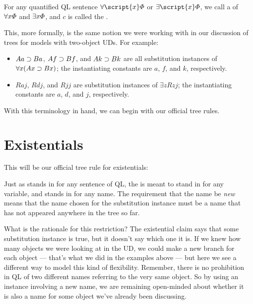 For any quantified QL sentence $\forall \script{x} \metaA{}$ or $\exists \script{x} \metaA{}$, we call \metaA{} a  of $\forall x\varPhi{}$ and $\exists x\varPhi{}$, and $c$ is called the .

This, more formally, is the same notion we were working with in our discussion of trees for models with two-object UDs. For example:

\begin{itemize}
\item $Aa \supset Ba$, $Af \supset Bf$, and $Ak \supset Bk$ are all substitution instances of $\forall x(Ax \supset Bx)$; the instantiating constants are $a$, $f$, and $k$, respectively.
\item $Raj$, $Rdj$, and $Rjj$ are substitution instances of $\exists zRzj$; the instantiating constants are $a$, $d$, and $j$, respectively.
\end{itemize}

With this terminology in hand, we can begin with our official tree rules.

\section{Existentials}

This will be our official tree rule for existentials:


Just as \metaA{} stands in for any sentence of QL, the  is meant to stand in for any variable, and  stands in for any name. The requirement that the name be \emph{new} means that the name chosen for the substitution instance must be a name that has not appeared anywhere in the tree so far. 

What is the rationale for this restriction? The existential claim says that some substitution instance is true, but it doesn't say which one it is. If we knew how many objects we were looking at in the UD, we could make a new branch for each object --- that's what we did in the examples above --- but here we see a different way to model this kind of flexibility. Remember, there is no prohibition in QL of two different names referring to the very same object. So by using an instance involving a new name, we are remaining open-minded about whether it is also a name for some object we've already been discussing.

